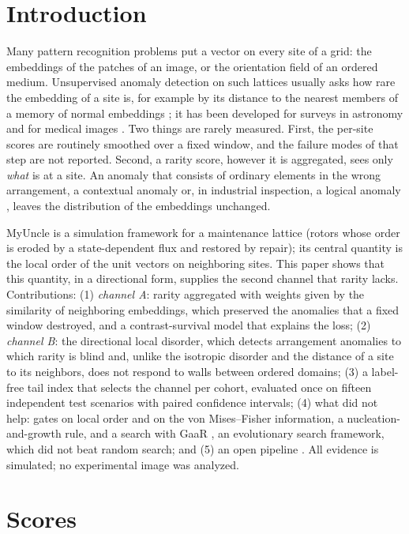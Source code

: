 \documentclass[final,5p,times,twocolumn,authoryear]{elsarticle}
\begin{document}
\section{Introduction}
Many pattern recognition problems put a vector on every site of a grid: the embeddings of the patches of an image, or the orientation field of an ordered medium. Unsupervised anomaly detection on such lattices usually asks how rare the embedding of a site is, for example by its distance to the nearest members of a memory of normal embeddings \citep{Roth2022}; it has been developed for surveys in astronomy \citep{Baron2017,Lochner2021} and for medical images \citep{Schlegl2019}. Two things are rarely measured. First, the per-site scores are routinely smoothed over a fixed window, and the failure modes of that step are not reported. Second, a rarity score, however it is aggregated, sees only \emph{what} is at a site. An anomaly that consists of ordinary elements in the wrong arrangement, a contextual anomaly \citep{Chandola2009} or, in industrial inspection, a logical anomaly \citep{Bergmann2022}, leaves the distribution of the embeddings unchanged.

MyUncle \citep{MyUncle2026} is a simulation framework for a maintenance lattice (rotors whose order is eroded by a state-dependent flux and restored by repair); its central quantity is the local order of the unit vectors on neighboring sites. This paper shows that this quantity, in a directional form, supplies the second channel that rarity lacks. Contributions: (1) \emph{channel A}: rarity aggregated with weights given by the similarity of neighboring embeddings, which preserved the anomalies that a fixed window destroyed, and a contrast-survival model that explains the loss; (2) \emph{channel B}: the directional local disorder, which detects arrangement anomalies to which rarity is blind and, unlike the isotropic disorder and the distance of a site to its neighbors, does not respond to walls between ordered domains; (3) a label-free tail index that selects the channel per cohort, evaluated once on fifteen independent test scenarios with paired confidence intervals; (4) what did not help: gates on local order and on the von Mises--Fisher information, a nucleation-and-growth rule, and a search with GaaR \citep{GaaR2026}, an evolutionary search framework, which did not beat random search; and (5) an open pipeline \citep{MyUncleVision2026}. All evidence is simulated; no experimental image was analyzed.

\section{Scores}
\end{document}
